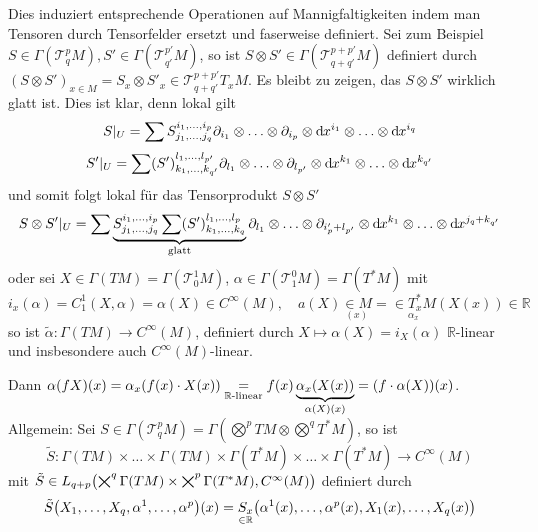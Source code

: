 Dies induziert entsprechende Operationen auf Mannigfaltigkeiten indem man Tensoren durch Tensorfelder ersetzt und faserweise definiert. Sei zum Beispiel $S\in \Gamma(\mathcal{T}_q^p M), S'\in \Gamma(\mathcal{T}_{q'}^{p'} M)$, so ist $S\otimes S' \in \Gamma(\mathcal{T}_{q+q'}^{p+p'} M)$ definiert durch $(S\otimes S')_{x\in M} = S_x\otimes S'_x \in \mathcal{T}_{q+q'}^{p+p'} T_x M$. Es bleibt zu zeigen, das $S\otimes S'$ wirklich glatt ist. Dies ist klar, denn lokal gilt 
\[S\vert_U = \sum S_{j_1,\ldots,j_q}^{i_1,\ldots,i_p} \partial_{i_1}\otimes \ldots \otimes \partial_{i_p} \otimes \mathrm{d}\mkern-1.0mu x^{i_1}\otimes \ldots \otimes \mathrm{d}\mkern-1.0mu x^{i_q}
\]
\[
S'\vert_U = \sum (S')_{k_1,\ldots,k_{q'}}^{l_1,\ldots,l_{p'}} \partial_{l_1}\otimes \ldots \otimes \partial_{l_{p'}} \otimes \mathrm{d}\mkern-1.0mu x^{k_1}\otimes \ldots \otimes \mathrm{d}\mkern-1.0mu x^{k_{q'}}
\]
und somit folgt lokal für das Tensorprodukt $S\otimes S'$
\[
S\otimes S'\vert_U = \sum \underbrace{S_{j_1,\ldots,j_q}^{i_1,\ldots,i_p} \sum (S')_{k_1,\ldots,k_q}^{l_1,\ldots,l_p}}_{\text{glatt}} \partial_{l_1}\otimes \ldots \otimes \partial_{i_p'+l_{p'}} \otimes \mathrm{d}\mkern-1.0mu x^{k_1}\otimes \ldots \otimes \mathrm{d}\mkern-1.0mu x^{j_q + k_{q'}}
\]
oder sei $X\in \Gamma(TM) = \Gamma(\mathcal{T}_0^1 M)$, $\alpha\in \Gamma(\mathcal{T}_1^0 M) = \Gamma(T^* M)$ mit 
\[
i_x(\alpha) = C_1^1(X,\alpha) = \alpha(X) \in C^\infty (M),\quad a(X)\underset{(x)}{\in M} = \underset{\alpha_x}{\in T^*_x M}(X(x))\in \mathds{R}
\]
so ist $\tilde{\alpha}:\Gamma(TM) \to C^\infty(M)$, definiert durch $X\mapsto \alpha(X) = i_X(\alpha)$ $\mathds{R}$-linear und insbesondere auch $C^\infty (M)$-linear.
\begin{figure}[H]
\end{figure}
Dann $\alpha(fX)(x) = \alpha_x(f(x)\cdot X(x)) \underset{\mathbb{R}\text{-linear}}{=} f(x) \underbrace{\alpha_x(X(x))}_{\alpha(X)(x)} = (f\cdot \alpha(X))(x)$.\\
Allgemein: Sei $S\in \Gamma(\mathcal{T}_q^p M) = \Gamma(\bigotimes^p TM \otimes \bigotimes^q T^* M)$, so ist 
\[
\tilde{S}:\Gamma(TM)\times \ldots \times \Gamma(TM)\times \Gamma(T^* M)\times \ldots \times \Gamma(T^* M)\to C^\infty (M)
\]
mit $\tilde{S}\in L_{q+p}\enbrace*{\bigtimes^q \Gamma(TM)\times \bigtimes^p \Gamma(T^* M),C^\infty (M)}$ definiert durch
\[
\tilde{S}\enbrace*{X_1,\ldots,X_q,\alpha^1,\ldots, \alpha^p}(x) = \underset{\in \mathds{R}}{S_x}\enbrace*{\alpha^1(x),\ldots, \alpha^p(x), X_1(x),\ldots, X_q(x)}
\]

